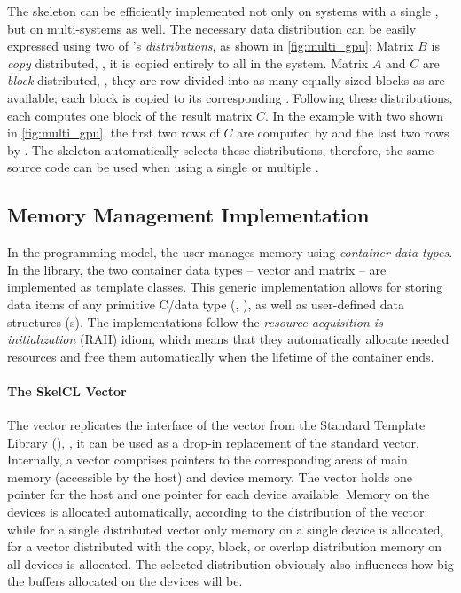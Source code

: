 The \allpairs skeleton can be efficiently implemented not only on systems with a single \GPU, but on multi-\GPU systems as well.
The necessary data distribution can be easily expressed using two of \SkelCL's \emph{distributions}, as shown in \autoref{fig:multi_gpu}:
Matrix $B$ is \emph{copy} distributed, \ie, it is copied entirely to all \GPUs in the system.
Matrix $A$ and $C$ are \emph{block} distributed, \ie, they are row-divided into as many equally-sized blocks as \GPUs are available;
each block is copied to its corresponding \GPU.
Following these distributions, each \GPU computes one block of the result matrix $C$.
In the example with two \GPUs shown in \autoref{fig:multi_gpu}, the first two rows of $C$ are computed by  and the last two rows by .
The \allpairs skeleton automatically selects these distributions, therefore, the same source code can be used when using a single \GPU or multiple \GPUs.











\subsection{Memory Management Implementation}
\label{section:skelcl-library:memory-management}
In the \SkelCL programming model, the user manages memory using \emph{container data types}.
In the \SkelCL library, the two container data types -- vector and matrix -- are implemented as template classes.
This generic implementation allows for storing data items of any primitive C/\Cpp data type (\eg, ), as well as user-defined data structures (s).
The implementations follow the \emph{resource acquisition is initialization} (RAII) idiom, which means that they automatically allocate needed resources and free them automatically when the lifetime of the container ends.

\paragraph{The SkelCL Vector}
The \SkelCL vector replicates the interface of the vector from the \Cpp Standard Template Library (\STL), \ie, it can be used as a drop-in replacement of the standard vector.
Internally, a vector comprises pointers to the corresponding areas of main memory (accessible by the host) and device memory.
The vector holds one pointer for the host and one pointer for each device available.
Memory on the devices is allocated automatically, according to the distribution of the vector:
while for a single distributed vector only memory on a single device is allocated, for a vector distributed with the copy, block, or overlap distribution memory on all devices is allocated.
The selected distribution obviously also influences how big the buffers allocated on the devices will be.

